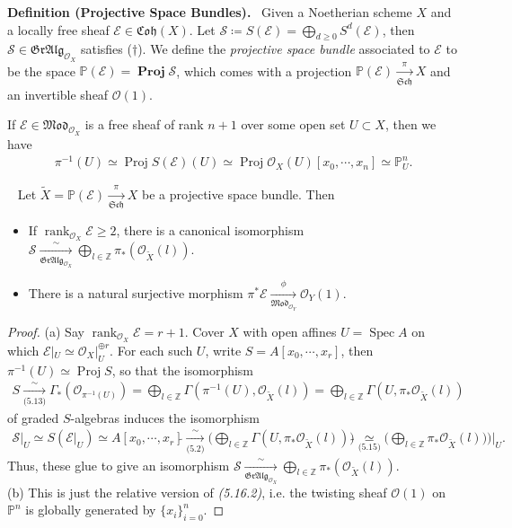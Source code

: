 \documentclass[11pt,a4paper,footinclude=true,headinclude=true]{scrbook} %
\DeclareMathOperator{\Spec}{Spec}
\DeclareMathOperator{\Proj}{Proj}
\DeclareMathOperator{\PROJ}{\mathbf{Proj}}
\DeclareMathOperator{\rank}{rank}
\newcommand{\EE}{\mathscr{E}}
\newcommand{\OO}{\mathcal{O}}
\newcommand{\Ss}{\mathscr{S}}
\newcommand{\PP}{\mathbb{P}}
\newcommand{\Sch}{\mathfrak{Sch}}
\newcommand{\<}{\langle}
\newcommand{\>}{\rangle}
\newcommand{\GR}{\mathfrak{Gr}}
\newcommand{\MOD}{\mathfrak{Mod}}
\newcommand{\ALG}{\mathfrak{Alg}}
\newcommand{\coh}{\mathfrak{Coh}}
\newenvironment{proposition}[2][]
{\renewcommand\theinnercustomprop{#2}\innercustomprop[#1] 
\begin{mdframed}[backgroundcolor=gray!20]\ }
{\end{mdframed}\endinnercustomprop}
\newenvironment{definition}[2][Definition]
    { \begin{mdframed}[backgroundcolor=gray!20] \textbf{#1 #2.}\ }
    {  \end{mdframed}}
\newenvironment{remark*}[2][Remark]
    { \begin{mdframed}[backgroundcolor=gray!20] \textbf{#1.}\ }
    {  \end{mdframed}}
\begin{document}
\begin{definition}{(Projective Space Bundles)}
    Given a Noetherian scheme $X$ and  a locally free sheaf $\EE\in\coh(X)$. Let $\Ss\coloneqq S(\EE)=\bigoplus_{d\geq0}S^d(\EE)$, then $\Ss\in\GR\ALG_{\OO_X}$ satisfies ($\dagger$). We define the \textit{projective space bundle} associated to $\EE$ to be the space $\PP(\EE)=\PROJ\Ss$, which comes with a projection $\PP(\EE)\xrightarrow[\Sch]{\pi}X$ and an invertible sheaf $\OO(1)$.
\end{definition}

\begin{remark*}{}
    If $\EE\in\MOD_{\OO_X}$ is a free sheaf of rank $n+1$ over some open set $U\subset X$, then we have
    \begin{align*}
        \pi^{-1}(U)\simeq\Proj S(\EE)(U)\simeq\Proj\OO_X(U)[x_0,\cdots,x_n]\simeq\PP_U^n.
    \end{align*}
\end{remark*}

\begin{proposition}{7.11}
    Let $\widetilde{X}=\PP(\EE)\xrightarrow[\Sch]{\pi}X$ be a projective space bundle. Then
    \begin{itemize}
        \item[(a)] If $\rank_{\OO_X}\EE\geq2$, there is a canonical isomorphism $\Ss\xrightarrow[\GR\ALG_{\OO_X}]{\sim}\bigoplus_{l\in\mathbb{Z}}\pi_\ast(\OO_{\widetilde{X}}(l))$.
        \item[(b)] There is a natural surjective morphism $\pi^\ast\EE\xrightarrow[\MOD_{\OO_Y}]{\phi}\OO_Y(1)$.
    \end{itemize}
\end{proposition}
\begin{proof}
    (a) Say $\rank_{\OO_X}\EE=r+1$. Cover $X$ with open affines $U=\Spec A$ on which $\EE|_U\simeq\OO_X|_U^{\oplus r}$. For each such $U$, write $S=A[x_0,\cdots,x_r]$, then $\pi^{-1}(U)\simeq\Proj S$, so that the isomorphism
    \begin{align*}
        S\xrightarrow[\text{(5.13)}]{\sim}\Gamma_\ast(\OO_{\pi^{-1}(U)})=\bigoplus_{l\in\mathbb{Z}}\Gamma(\pi^{-1}(U),\OO_{\widetilde{X}}(l))=\bigoplus_{l\in\mathbb{Z}}\Gamma(U,\pi_\ast\OO_{\widetilde{X}}(l))
    \end{align*}
    of graded $S$-algebras induces the isomorphism
    \begin{align*}
        \Ss|_U\simeq S(\EE|_U)\simeq A[x_0,\cdots,x_r]\widetilde{}\xrightarrow[\text{(5.2)}]{\sim}\Big(\bigoplus_{l\in\mathbb{Z}}\Gamma(U,\pi_\ast\OO_{\widetilde{X}}(l))\Big)\widetilde{}\underset{\text{(5.15)}}{\simeq}\Big(\bigoplus_{l\in\mathbb{Z}}\pi_\ast\OO_{\widetilde{X}}(l))\Big)\Big|_U.
    \end{align*}
    Thus, these glue to give an isomorphism $\Ss\xrightarrow[\GR\ALG_{\OO_X}]{\sim}\bigoplus_{l\in\mathbb{Z}}\pi_\ast(\OO_{\widetilde{X}}(l))$.\\
    
    (b) This is just the relative version of \textit{(5.16.2)}, i.e. the twisting sheaf $\OO(1)$ on $\PP^n$ is globally generated by $\{x_i\}_{i=0}^n$.
\end{proof}
\end{document}
